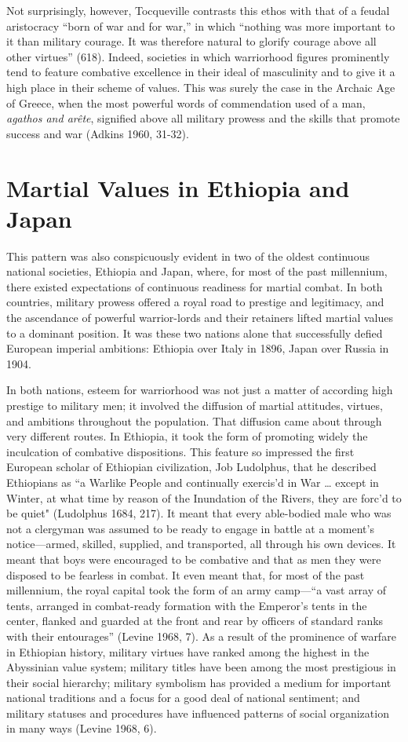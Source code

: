 Not surprisingly, however, Tocqueville contrasts this ethos with that of a feudal aristocracy ``born of war and for war,'' in which ``nothing was more important to it than military courage. It was therefore natural to glorify courage above all other virtues'' (618). Indeed, societies in which warriorhood figures prominently tend to feature combative excellence in their ideal of masculinity and to give it a high place in their scheme of values. This was surely the case in the Archaic Age of Greece, when the most powerful words of commendation used of a man, \emph{agathos and ar\^{e}te}, signified above all military prowess and the skills that promote success and war (Adkins 1960, 31-32). 

\section*{Martial Values in Ethiopia and Japan}

This pattern was also conspicuously evident in two of the oldest continuous national societies, Ethiopia and Japan, where, for most of the past millennium, there existed expectations of continuous readiness for martial combat. In both countries, military prowess offered a royal road to prestige and legitimacy, and the ascendance of powerful warrior-lords and their retainers lifted martial values to a dominant position. It was these two nations alone that successfully defied European imperial ambitions: Ethiopia over Italy in 1896, Japan over Russia in 1904.

In both nations, esteem for warriorhood was not just a matter of according high prestige to military men; it involved the diffusion of martial attitudes, virtues, and ambitions throughout the population. That diffusion came about through very different routes. In Ethiopia, it took the form of promoting widely the inculcation of combative dispositions. This feature so impressed the first European scholar of Ethiopian civilization, Job Ludolphus, that he described Ethiopians as ``a Warlike People and continually exercis'd in War \ldots{} except in Winter, at what time by reason of the Inundation of the Rivers, they are forc'd to be quiet" (Ludolphus 1684, 217). It meant that every able-bodied male who was not a clergyman was assumed to be ready to engage in battle at a moment's notice---armed, skilled, supplied, and transported, all through his own devices. It meant that boys were encouraged to be combative and that as men they were disposed to be fearless in combat. It even meant that, for most of the past millennium, the royal capital took the form of an army camp---``a vast array of tents, arranged in combat-ready formation with the Emperor's tents in the center, flanked and guarded at the front and rear by officers of standard ranks with their entourages'' (Levine 1968, 7). As a result of the prominence of warfare in Ethiopian history, military virtues have ranked among the highest in the Abyssinian value system; military titles have been among the most prestigious in their social hierarchy; military symbolism has provided a medium for important national traditions and a focus for a good deal of national sentiment; and military statuses and procedures have influenced patterns of social organization in many ways (Levine 1968, 6).

